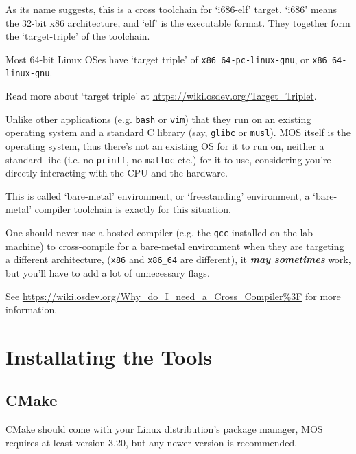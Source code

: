 As its name suggests, this is a cross toolchain for `i686-elf' target. `i686' means the 32-bit
x86 architecture, and `elf' is the executable format. They together form the `target-triple' of
the toolchain.

\begin{tip}
    \item Most 64-bit Linux OSes have `target triple' of \texttt{x86\_64-pc-linux-gnu}, or
    \texttt{x86\_64-linux-gnu}.
    \item Read more about `target triple' at \url{https://wiki.osdev.org/Target_Triplet}.
\end{tip}

Unlike other applications (e.g. \texttt{bash} or \texttt{vim}) that they run on an existing
operating system and a standard C library (say, \texttt{glibc} or \texttt{musl}). MOS itself is
the operating system, thus there's not an existing OS for it to run on, neither a standard libc
(i.e. no \texttt{printf}, no \texttt{malloc} etc.) for it to use, considering you're directly
interacting with the CPU and the hardware.

This is called `bare-metal' environment, or `freestanding' environment, a `bare-metal' compiler
toolchain is exactly for this situation.

\begin{warning}
    \item One should never use a hosted compiler (e.g. the \texttt{gcc} installed on the lab machine)
    to cross-compile for a bare-metal environment when they are targeting a different architecture,
    (\texttt{x86} and \texttt{x86\_64} are different), it \textit{\textbf{may sometimes}} work, but
    you'll have to add a lot of unnecessary flags.

    \item See \url{https://wiki.osdev.org/Why_do_I_need_a_Cross_Compiler%3F} for more information.
\end{warning}

\section{Installating the Tools}

\subsection{CMake} \label{sec:cmake-install}

CMake should come with your Linux distribution's package manager, MOS requires at least version
3.20, but any newer version is recommended.

